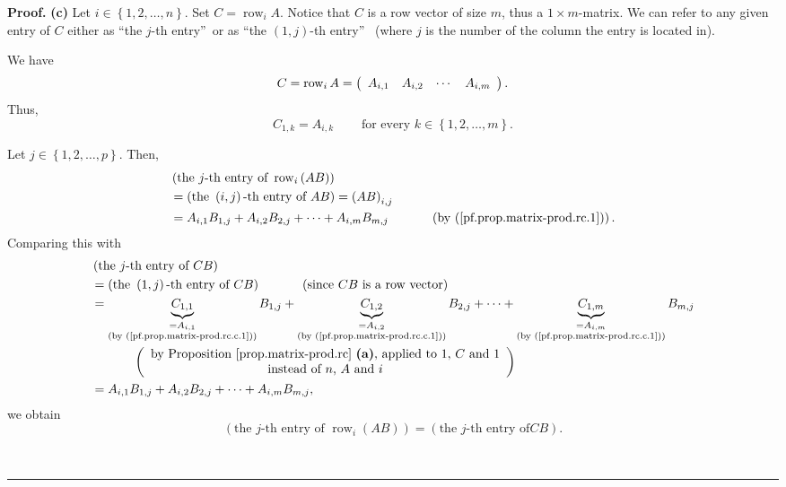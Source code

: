 \documentclass[numbers=enddot,12pt,final,onecolumn,notitlepage]{scrartcl}%
\theoremstyle{definition}
\newenvironment{proof}[1][Proof]{\noindent\textbf{#1.} }{\ \rule{0.5em}{0.5em}}
\begin{document}
\begin{proof}
\textbf{(c)} Let $i\in\left\{  1,2,\ldots,n\right\}  $. Set
$C=\operatorname*{row}\nolimits_{i}A$. Notice that $C$ is a row vector of size
$m$, thus a $1\times m$-matrix. We can refer to any given entry of $C$ either
as \textquotedblleft the $j$-th entry\textquotedblright\ or as
\textquotedblleft the $\left(  1,j\right)  $-th entry\textquotedblright%
\ (where $j$ is the number of the column the entry is located in).

We have%
\[
C=\operatorname*{row}\nolimits_{i}A=\left(
\begin{array}
[c]{cccc}%
A_{i,1} & A_{i,2} & \cdots & A_{i,m}%
\end{array}
\right)  .
\]
Thus,%
\begin{equation}
C_{1,k}=A_{i,k}\ \ \ \ \ \ \ \ \ \ \text{for every }k\in\left\{
1,2,\ldots,m\right\}  . \label{pf.prop.matrix-prod.rc.c.1}%
\end{equation}


Let $j\in\left\{  1,2,\ldots,p\right\}  $. Then,%
\begin{align*}
&  \left(  \text{the }j\text{-th entry of }\operatorname*{row}\nolimits_{i}%
\left(  AB\right)  \right) \\
&  =\left(  \text{the }\left(  i,j\right)  \text{-th entry of }AB\right)
=\left(  AB\right)  _{i,j}\\
&  =A_{i,1}B_{1,j}+A_{i,2}B_{2,j}+\cdots+A_{i,m}B_{m,j}%
\ \ \ \ \ \ \ \ \ \ \left(  \text{by (\ref{pf.prop.matrix-prod.rc.1})}\right)
.
\end{align*}
Comparing this with%
\begin{align*}
&  \left(  \text{the }j\text{-th entry of }CB\right) \\
&  =\left(  \text{the }\left(  1,j\right)  \text{-th entry of }CB\right)
\ \ \ \ \ \ \ \ \ \ \left(  \text{since }CB\text{ is a row vector}\right) \\
&  =\underbrace{C_{1,1}}_{\substack{=A_{i,1}\\\text{(by
(\ref{pf.prop.matrix-prod.rc.c.1}))}}}B_{1,j}+\underbrace{C_{1,2}%
}_{\substack{=A_{i,2}\\\text{(by (\ref{pf.prop.matrix-prod.rc.c.1}))}}%
}B_{2,j}+\cdots+\underbrace{C_{1,m}}_{\substack{=A_{i,m}\\\text{(by
(\ref{pf.prop.matrix-prod.rc.c.1}))}}}B_{m,j}\\
&  \ \ \ \ \ \ \ \ \ \ \left(
\begin{array}
[c]{c}%
\text{by Proposition \ref{prop.matrix-prod.rc} \textbf{(a)}, applied to
}1\text{, }C\text{ and }1\\
\text{instead of }n\text{, }A\text{ and }i
\end{array}
\right) \\
&  =A_{i,1}B_{1,j}+A_{i,2}B_{2,j}+\cdots+A_{i,m}B_{m,j},
\end{align*}
we obtain%
\begin{equation}
\left(  \text{the }j\text{-th entry of }\operatorname*{row}\nolimits_{i}%
\left(  AB\right)  \right)  =\left(  \text{the }j\text{-th entry of
}CB\right)  . \label{pf.prop.matrix-prod.rc.c.5}%
\end{equation}



\end{proof}
\end{document}

